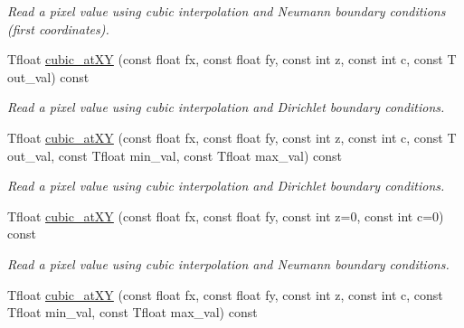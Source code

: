 \begin{DoxyCompactItemize}
\begin{DoxyCompactList}\small\item\em Read a pixel value using cubic interpolation and Neumann boundary conditions (first coordinates). \item\end{DoxyCompactList}\item 
\hypertarget{structcimg__library_1_1CImg_a7173fdbb196c4d8cb5ee2336247a4fff}{
Tfloat \hyperlink{structcimg__library_1_1CImg_a7173fdbb196c4d8cb5ee2336247a4fff}{cubic\_\-atXY} (const float fx, const float fy, const int z, const int c, const T out\_\-val) const }
\label{structcimg__library_1_1CImg_a7173fdbb196c4d8cb5ee2336247a4fff}

\begin{DoxyCompactList}\small\item\em Read a pixel value using cubic interpolation and Dirichlet boundary conditions. \item\end{DoxyCompactList}\item 
\hypertarget{structcimg__library_1_1CImg_a7b581b3574c1831c18651b2dfd477820}{
Tfloat \hyperlink{structcimg__library_1_1CImg_a7b581b3574c1831c18651b2dfd477820}{cubic\_\-atXY} (const float fx, const float fy, const int z, const int c, const T out\_\-val, const Tfloat min\_\-val, const Tfloat max\_\-val) const }
\label{structcimg__library_1_1CImg_a7b581b3574c1831c18651b2dfd477820}

\begin{DoxyCompactList}\small\item\em Read a pixel value using cubic interpolation and Dirichlet boundary conditions. \item\end{DoxyCompactList}\item 
\hypertarget{structcimg__library_1_1CImg_abab7d26fbd2eddc68c582fc582fc5505}{
Tfloat \hyperlink{structcimg__library_1_1CImg_abab7d26fbd2eddc68c582fc582fc5505}{cubic\_\-atXY} (const float fx, const float fy, const int z=0, const int c=0) const }
\label{structcimg__library_1_1CImg_abab7d26fbd2eddc68c582fc582fc5505}

\begin{DoxyCompactList}\small\item\em Read a pixel value using cubic interpolation and Neumann boundary conditions. \item\end{DoxyCompactList}\item 
\hypertarget{structcimg__library_1_1CImg_a8c7a10ff505f33e32a0839322e6cbd66}{
Tfloat \hyperlink{structcimg__library_1_1CImg_a8c7a10ff505f33e32a0839322e6cbd66}{cubic\_\-atXY} (const float fx, const float fy, const int z, const int c, const Tfloat min\_\-val, const Tfloat max\_\-val) const }
\label{structcimg__library_1_1CImg_a8c7a10ff505f33e32a0839322e6cbd66}


\end{DoxyCompactItemize}

